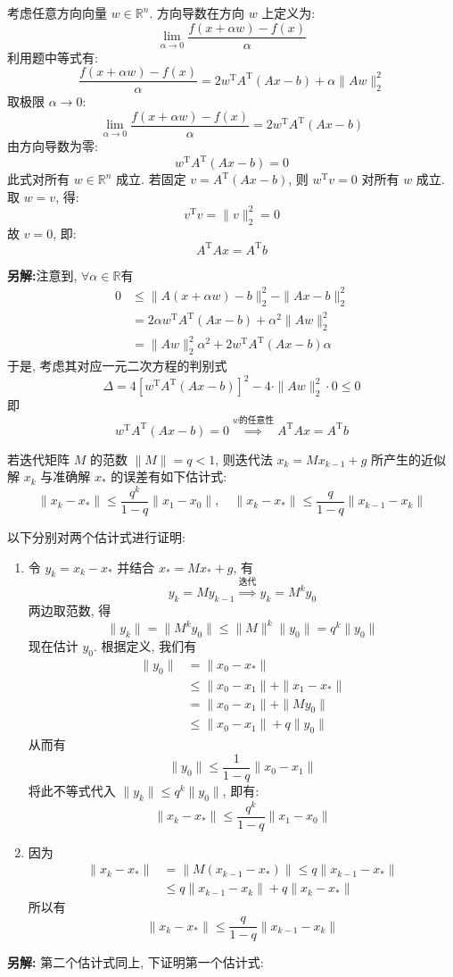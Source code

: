 \documentclass[12pt, answers]{exam}     %
\newcommand{\anothersolution}{\par\noindent\textbf{另解:}}
\newcommand{\R}{\mathbb{R}}
\newcommand{\T}{\mathrm{T}}
\begin{document}
\begin{questions}
\begin{solution}
考虑任意方向向量 \(w \in \R^n\). 方向导数在方向 \(w\) 上定义为:
\[
\lim_{\alpha \to 0} \frac{f(x + \alpha w) - f(x)}\alpha
\]
利用题中等式有:
\[
\frac{f(x + \alpha w) - f(x)}\alpha = 2 w^{\T} A^{\T} (Ax - b) + \alpha \|Aw\|_2^2
\]
取极限 \(\alpha \to 0\):
\[
\lim_{\alpha \to 0} \frac{f(x + \alpha w) - f(x)}\alpha = 2 w^{\T} A^{\T} (Ax - b)
\]
由方向导数为零:
\[
w^{\T} A^{\T} (Ax - b) = 0
\]
此式对所有 \(w \in \R^n\) 成立. 若固定 \(v = A^{\T} (Ax - b)\), 则 \(w^{\T} v = 0\) 对所有 \(w\) 成立. 取 \(w = v\), 得:
\[
v^{\T} v = \|v\|_2^2 = 0
\]
故 \(v = 0\), 即:
\[
A^{\T} A x = A^{\T} b
\]
\anothersolution{}注意到, $ \forall \alpha \in \R $有
\begin{align*}
0 &\le \|A(x + \alpha w) - b\|_2^2 - \|Ax - b\|_2^2  \\ 
&= 2\alpha w^{\T} A^{\T} (Ax - b) + \alpha^2 \|Aw\|_2^2  \\
&= \|Aw\|_2^2 \alpha^2 + 2w^{\T} A^{\T} (Ax - b) \alpha
\end{align*}
于是, 考虑其对应一元二次方程的判别式
\[
\Delta = 4[w^{\T} A^{\T} (Ax - b)]^2 - 4 \cdot \|Aw\|_2^2 \cdot 0 \le 0
\]
即
\[
w^{\T} A^{\T} (Ax - b) = 0 \overset{w \text{的任意性}}{\implies} A^{\T}Ax = A^{\T}b
\]
\end{solution}

\question{}若迭代矩阵 \( M \) 的范数 \(\|M\| = q < 1\), 则迭代法 $ x_k = Mx_{k-1} + g $ 所产生的近似解 \( x_k \) 与准确解 \( x_* \) 的误差有如下估计式:
\[
\|x_k - x_*\| \leq \frac{q^k}{1-q} \|x_1 - x_0\|, \quad \|x_k - x_*\| \leq \frac{q}{1-q} \|x_{k-1} - x_k\|
\]

\begin{solution}以下分别对两个估计式进行证明:
\begin{enumerate}
    \item
    令 $ y_k = x_k - x_* $ 并结合 $ x_* = Mx_* + g $, 有
    \[
    y_k = My_{k-1} \overset{\text{迭代}}{\implies}  y_k = M^k y_0
    \]
    两边取范数, 得
    \[
    \|y_k\| = \|M^k y_0\| \leq \|M\|^k \|y_0\| = q^k \|y_0\|
    \]
    现在估计 \( y_0 \). 根据定义, 我们有
    \begin{align*}
    \|y_0\| &= \|x_0 - x_*\| \\
    &\leq \|x_0 - x_1\| + \|x_1 - x_*\| \\
    &= \|x_0 - x_1\| + \|My_0\| \\
    &\leq \|x_0 - x_1\| + q \|y_0\|
    \end{align*}
    从而有
    \[
    \|y_0\| \leq \frac{1}{1-q} \|x_0 - x_1\|
    \]
    将此不等式代入 $ \|y_k\| \leq q^k \|y_0\| $, 即有:
    \[
    \|x_k - x_*\| \leq \frac{q^k}{1-q} \|x_1 - x_0\|
    \]
    \item
    因为
    \begin{align*}
    \|x_k - x_*\| &= \| M(x_{k-1} - x_*) \| \leq q \| x_{k-1} - x_* \|  \\
    &\leq q \| x_{k-1} - x_k \| + q \| x_k - x_* \|
    \end{align*}
    所以有
    \[
    \|x_k - x_*\| \leq \dfrac{q}{1-q} \|x_{k-1} - x_k\|
    \]
\end{enumerate}
\anothersolution{}
第二个估计式同上, 下证明第一个估计式:


\end{solution}
\end{questions}
\end{document}
